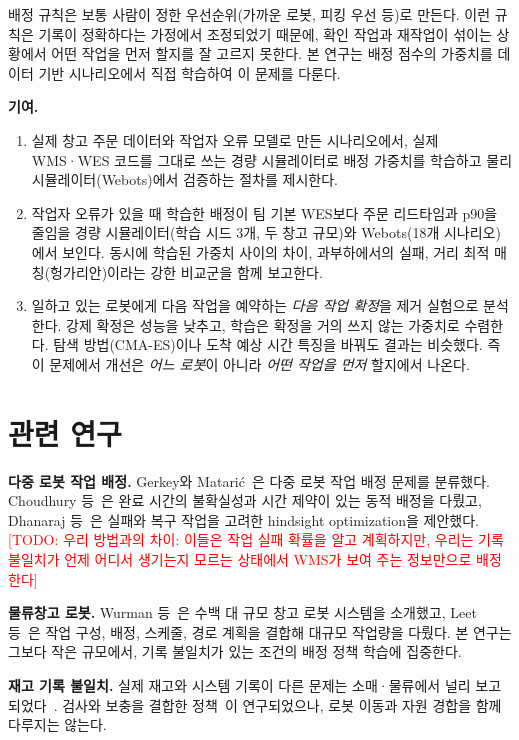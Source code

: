 \documentclass[10pt,twocolumn]{article}
\newcommand{\todo}[1]{\textcolor{red}{[TODO: #1]}}
\begin{document}
배정 규칙은 보통 사람이 정한 우선순위(가까운 로봇, 피킹 우선 등)로 만든다.
이런 규칙은 기록이 정확하다는 가정에서 조정되었기 때문에, 확인 작업과 재작업이 섞이는 상황에서 어떤 작업을 먼저 할지를 잘 고르지 못한다.
본 연구는 배정 점수의 가중치를 데이터 기반 시나리오에서 직접 학습하여 이 문제를 다룬다.

\textbf{기여.}
\begin{enumerate}
  \item 실제 창고 주문 데이터와 작업자 오류 모델로 만든 시나리오에서, 실제 WMS·WES 코드를 그대로 쓰는 경량 시뮬레이터로 배정 가중치를 학습하고 물리 시뮬레이터(Webots)에서 검증하는 절차를 제시한다.
  \item 작업자 오류가 있을 때 학습한 배정이 팀 기본 WES보다 주문 리드타임과 p90을 줄임을 경량 시뮬레이터(학습 시드 3개, 두 창고 규모)와 Webots(18개 시나리오)에서 보인다. 동시에 학습된 가중치 사이의 차이, 과부하에서의 실패, 거리 최적 매칭(헝가리안)이라는 강한 비교군을 함께 보고한다.
  \item 일하고 있는 로봇에게 다음 작업을 예약하는 \emph{다음 작업 확정}을 제거 실험으로 분석한다. 강제 확정은 성능을 낮추고, 학습은 확정을 거의 쓰지 않는 가중치로 수렴한다. 탐색 방법(CMA-ES)이나 도착 예상 시간 특징을 바꿔도 결과는 비슷했다. 즉 이 문제에서 개선은 \emph{어느 로봇}이 아니라 \emph{어떤 작업을 먼저} 할지에서 나온다.
\end{enumerate}

\section{관련 연구}

\textbf{다중 로봇 작업 배정.}
Gerkey와 Matari\'{c}~\cite{gerkey2004}은 다중 로봇 작업 배정 문제를 분류했다.
Choudhury 등~\cite{choudhury2020}은 완료 시간의 불확실성과 시간 제약이 있는 동적 배정을 다뤘고,
Dhanaraj 등~\cite{dhanaraj2024}은 실패와 복구 작업을 고려한 hindsight optimization을 제안했다.
\todo{우리 방법과의 차이: 이들은 작업 실패 확률을 알고 계획하지만, 우리는 기록 불일치가 언제 어디서 생기는지 모르는 상태에서 WMS가 보여 주는 정보만으로 배정한다}

\textbf{물류창고 로봇.}
Wurman 등~\cite{wurman2008}은 수백 대 규모 창고 로봇 시스템을 소개했고,
Leet 등~\cite{leet2023}은 작업 구성, 배정, 스케줄, 경로 계획을 결합해 대규모 작업량을 다뤘다.
본 연구는 그보다 작은 규모에서, 기록 불일치가 있는 조건의 배정 정책 학습에 집중한다.

\textbf{재고 기록 불일치.}
실제 재고와 시스템 기록이 다른 문제는 소매·물류에서 널리 보고되었다~\cite{dehoratius2008}.
검사와 보충을 결합한 정책~\cite{kok2007,akkerman2025}이 연구되었으나, 로봇 이동과 자원 경합을 함께 다루지는 않는다.
\end{document}
